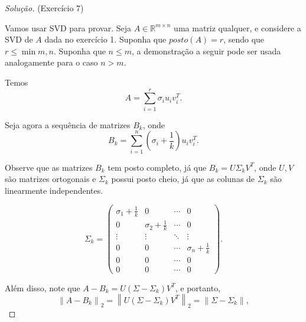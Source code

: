 \documentclass[a4paper,10pt]{article}
\newenvironment{solution}
  {\begin{proof}[Solução]}
  {\end{proof}}
\newcommand{\norm}[1]{\left\lVert#1\right\rVert}
\begin{document}
  \begin{solution}{(Exercício 7)}

    Vamos usar SVD para provar. Seja $A \in \mathbb{R}^{m\times n}$ uma matriz
    qualquer, e considere a SVD de $A$ dada no exercício 1. Suponha que
    $posto(A) = r$, sendo que $r \leq \min{m,n}$. Suponha que $n \leq m$, a
    demonstração a seguir pode ser usada analogamente para o caso $n > m$.

    Temos
    \begin{equation*}
      A = \sum_{i=1}^{r}\sigma_i u_iv_i^T.
    \end{equation*}

    Seja agora a sequência de matrizes $B_k$, onde
    \begin{equation*}
      B_k = \sum_{i=1}^{n} \left(\sigma_i + \frac{1}{k}\right)u_iv_i^T.
    \end{equation*}

    Observe que as matrizes $B_k$ tem posto completo, já que
    $B_k = U\Sigma_kV^T$, onde $U,V$ são matrizes ortogonais e $\Sigma_k$ possui
    posto cheio, já que as colunas de $\Sigma_k$ são linearmente independentes.

    \begin{equation*}
      \Sigma_k =
      \begin{pmatrix}
        \sigma_1 + \frac{1}{k} & 0 & \cdots & 0 \\
        0 & \sigma_2 + \frac{1}{k} & \cdots & 0 \\
        \vdots & \vdots & \ddots & \vdots \\
        0 & 0 & \cdots & \sigma_n + \frac{1}{k} \\
        0 & 0 & \cdots & 0 \\
        0 & 0 & \cdots & 0
      \end{pmatrix}.
    \end{equation*}

    Além disso, note que $A - B_k = U(\Sigma - \Sigma_k)V^T$, e portanto,
    \begin{equation*}
      \norm{A-B_k}_2 = \norm{U(\Sigma - \Sigma_k)V^T}_2 = \norm{\Sigma - \Sigma_k},
    \end{equation*}


\end{solution}
\end{document}
